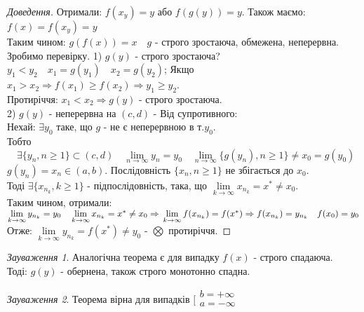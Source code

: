 \documentclass[14pt,a4paper]{scrartcl}
\theoremstyle{definition}
\theoremstyle{remark}
\newtheorem*{remark}{Зауваження}
\theoremstyle{definition}
\theoremstyle{definition}
\begin{document}
\begin{proof}[Доведення]
  Отримали: $f(x_y) = y$ або $f(g(y)) = y$. Також маємо: $f(x) = f(x_y) = y$\\
  Таким чином: \quad $g(f(x)) = x \quad g$ - строго зростаюча, обмежена, неперервна.\\
  Зробимо перевірку. 1) $g(y)$ - строго зростаюча?\\
  $y_1 < y_2 \quad x_1 = g(y_1) \quad x_2 = g(y_2)$; Якщо $x_1> x_2 \Rightarrow f(x_1) \geq f(x_2) \Rightarrow y_1 \geq y_2$.\\
  Протиріччя: \quad $x_1 < x_2 \Rightarrow g(y)$ - строго зростаюча.\\
  2) $g(y)$ - неперервна на $(c, d)$ - Від супротивного:\\
  Нехай: $\exists y_0 $ таке, що $g$ - не є неперервною в т.$y_0$.\\
  Тобто $\quad\exists \lbrace y_n, n \geq 1 \rbrace \subset (c,d) \quad  \lim\limits_{n\to \infty}{y_n} = y_0 \quad  \lim\limits_{n\to \infty}{\lbrace g(y_n), n\geq 1 \rbrace } \neq x_0  = g(y_0)$\\
  $g(y_n) = x_n \in (a,b)$. \quad Послідовність $\lbrace x_n , n \geq 1 \rbrace $ не збігається до $x_0$. \\
  Тоді \quad $ \exists \lbrace x_{n_k}, k \geq 1 \rbrace $ - підпослідовність, така, що $  \lim\limits_{k\to\infty}{x_{n_k}} = x^* \neq x_0$.\\
  Таким чином, отримали: \quad $  \lim\limits_{k\to \infty}{y_{n_k}}  = y_0 \quad  \lim\limits_{k\to  \infty}{x_{n_k}} = x^* \neq x_0 \Rightarrow\\  \lim\limits_{k\to  \infty}{f(x_{n_k})} = f(x^*)  \Rightarrow f(x_{n_k}) = y_{n_k} \quad f(x_0) = y_0$\\
  Отже: \quad $ \lim\limits_{k \to  \infty}{y_{n_k}} = f(x^*) \neq y_0 $ - $  \bigotimes $ протиріччя.
\end{proof}
\begin{remark}
  Аналогічна теорема є для випадку $f(x)$ - строго спадаюча. \\
  Тоді: \quad $g(y)$ - обернена, також строго монотонно спадна.
\end{remark}

\begin{remark}
  Теорема вірна для випадків $\Bigg[ \begin{gathered}
  b = + \infty\\
  a = - \infty \\
  \end{gathered}$
\end{remark}
\end{document}
